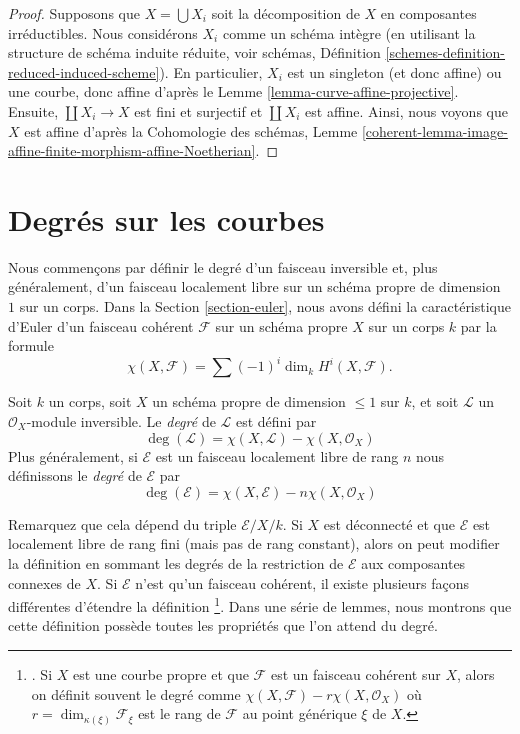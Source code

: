\begin{proof}
Supposons que $X = \bigcup X_i$ soit la décomposition de $X$ en
composantes irréductibles. Nous considérons $X_i$ comme un
schéma intègre (en utilisant la structure de schéma induite
réduite, voir schémas, Définition
\ref{schemes-definition-reduced-induced-scheme}). En particulier,
$X_i$ est un singleton (et donc affine) ou une courbe, donc affine
d'après le Lemme \ref{lemma-curve-affine-projective}. Ensuite,
$\coprod X_i \to X$ est fini et surjectif et $\coprod X_i$ est affine.
Ainsi, nous voyons que $X$ est affine d'après la Cohomologie des schémas,
Lemme \ref{coherent-lemma-image-affine-finite-morphism-affine-Noetherian}.
\end{proof}






\section{Degrés sur les courbes}
\label{section-divisors-curves}

\noindent
Nous commençons par définir le degré d'un faisceau
inversible et, plus généralement, d'un faisceau localement
libre sur un schéma propre de dimension $1$ sur un corps.
Dans la Section \ref{section-euler}, nous avons défini la
caractéristique d'Euler d'un faisceau cohérent
$\mathcal{F}$ sur un schéma propre $X$ sur un corps $k$ par la formule
$$
\chi(X, \mathcal{F}) = \sum (-1)^i \dim_k H^i(X, \mathcal{F}).
$$

\begin{definition}
\label{definition-degree-invertible-sheaf}
Soit $k$ un corps, soit $X$ un schéma propre de dimension
$\leq 1$ sur $k$, et soit $\mathcal{L}$ un
$\mathcal{O}_X$-module inversible. Le {\it degré } de $\mathcal{L}$ est défini par
$$
\deg(\mathcal{L}) = \chi(X, \mathcal{L}) - \chi(X, \mathcal{O}_X)
$$
Plus généralement, si $\mathcal{E}$ est un faisceau localement
libre de rang $n$ nous définissons le {\it degré } de $\mathcal{E}$ par
$$
\deg(\mathcal{E}) = \chi(X, \mathcal{E}) - n\chi(X, \mathcal{O}_X)
$$
\end{definition}

\noindent
Remarquez que cela dépend du triple $\mathcal{E}/X/k$. Si $X$ est
déconnecté et que $\mathcal{E}$ est localement libre de rang fini
(mais pas de rang constant), alors on peut modifier la définition
en sommant les degrés de la restriction de $\mathcal{E}$ aux
composantes connexes de $X$. Si $\mathcal{E}$ n'est qu'un faisceau
cohérent, il existe plusieurs façons différentes d'étendre la
définition \footnote {. Si $X$ est une courbe propre et que
$\mathcal{F}$ est un faisceau cohérent sur $X$, alors on définit souvent
le degré comme $\chi(X, \mathcal{F}) - r\chi(X, \mathcal{O}_X)$ où $r =
\dim_{\kappa(\xi)} \mathcal{F}_\xi$ est le rang de $\mathcal{F}$ au
point générique $\xi$ de $X$. }. Dans une série de lemmes, nous montrons
que cette définition possède toutes les propriétés que l'on attend du degré.

